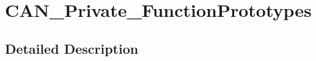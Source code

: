 \hypertarget{group___c_a_n___private___function_prototypes}{}\section{C\+A\+N\+\_\+\+Private\+\_\+\+Function\+Prototypes}
\label{group___c_a_n___private___function_prototypes}


\subsection{Detailed Description}
